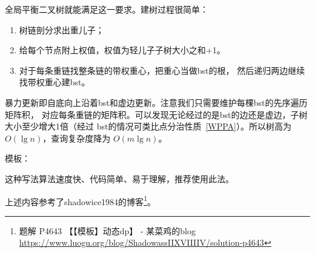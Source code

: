 全局平衡二叉树就能满足这一要求。建树过程很简单：
\begin{enumerate}
    \item 树链剖分求出重儿子；
    \item 给每个节点附上权值，权值为轻儿子子树大小之和+1。
    \item 对于每条重链找整条链的带权重心，把重心当做bst的根，
    然后递归两边继续找带权重心建bst。
\end{enumerate}

暴力更新即自底向上沿着bst和虚边更新。注意我们只需要维护每棵bst的先序遍历矩阵积，
对应每条重链的矩阵积。可以发现无论经过的是bst的边还是虚边，子树大小至少增大1倍（经过
bst的情况可类比点分治性质~\ref{WPPA}）。所以树高为$O(\lg n)$，查询复杂度降为
$O(m\lg n)$。

模板：


这种写法算法速度快、代码简单、易于理解，推荐使用此法。

上述内容参考了shadowice1984的博客\footnote{
    题解 P4643 【【模板】动态dp】 - 某菜鸡的blog\\
    \url{https://www.luogu.org/blog/ShadowassIIXVIIIIV/solution-p4643}
}。

